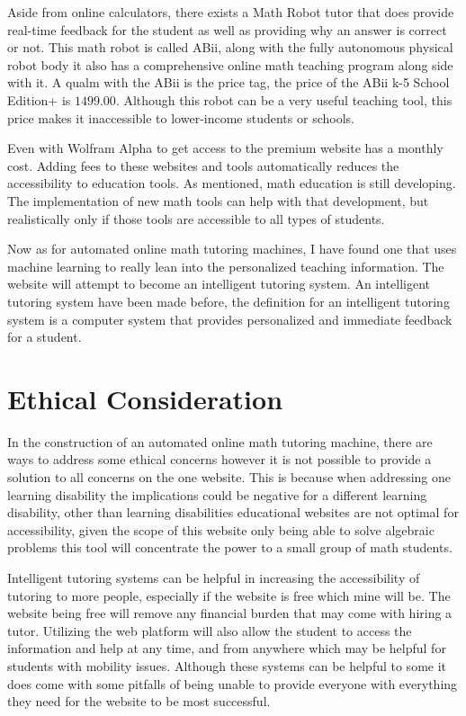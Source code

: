 \documentclass[10pt,twocolumn]{article}
\begin{document}
Aside from online calculators, there exists a Math Robot tutor that does provide real-time feedback for the student as well as providing why an answer is correct or not. This math robot is called ABii, along with the fully autonomous physical robot body it also has a comprehensive online math teaching program along side with it. A qualm with the ABii is  the price tag, the price of the ABii k-5 School Edition+ is $1499.00$. Although this robot can be a very useful teaching tool, this price makes it inaccessible to lower-income students or schools. 

Even with Wolfram Alpha to get access to the premium website has a monthly cost. Adding fees to these websites and tools automatically reduces the accessibility to education tools. As mentioned, math education is still developing. The implementation of new math tools can help with that development, but realistically only if those tools are accessible to all types of students. 

Now as for automated online math tutoring machines, I have found one that uses machine learning to really lean into the personalized teaching information. The website will attempt to become an intelligent tutoring system. An intelligent tutoring system have been made before, the definition for an intelligent tutoring system is a computer system that provides personalized and immediate feedback for a student.  

\section{Ethical Consideration}
 In the construction of an automated online math tutoring machine, there are ways to address some ethical concerns however it is not possible to provide a solution to all concerns on the one website. This is because when addressing one learning disability the implications could be negative for a different learning disability, other than learning disabilities educational websites are not optimal for accessibility, given the scope of this website only being able to solve algebraic problems this tool will concentrate the power to a small group of math students. 

Intelligent tutoring systems can be helpful in increasing the accessibility of tutoring to more people, especially if the website is free which mine will be. The website being free will remove any financial burden that may come with hiring a tutor. Utilizing the web platform will also allow the student to access the information and help at any time, and from anywhere which may be helpful for students with mobility issues. Although these systems can be helpful to some it does come with some pitfalls of being unable to provide everyone with everything they need for the website to be most successful. 
\end{document}

